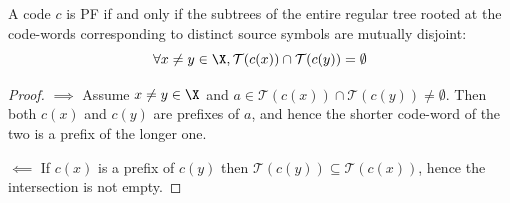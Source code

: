 \documentclass[toc, titlepaged]{../cs-classes/cs-classes}
\begin{document}
\begin{lemma}
    A code $c$ is PF if and only if the subtrees of the entire regular tree rooted at the code-words corresponding to distinct source symbols are mutually disjoint:
    \begin{equation*}
        \forall x\neq y\in \X, \mathcal{T}(c(x))\cap\mathcal{T}(c(y))=\emptyset
    \end{equation*}
\end{lemma}

\begin{proof}
    $\implies$
    Assume $x\neq y\in\X$ and $a\in \mathcal{T}(c(x))\cap\mathcal{T}(c(y))\neq\emptyset$. Then both $c(x)$ and $c(y)$ are prefixes of $a$, and hence the shorter code-word of the two is a prefix of the longer one.

    $\impliedby$ If $c(x)$ is a prefix of $c(y)$ then $\mathcal{T}(c(y))\subseteq \mathcal{T}(c(x))$, hence the intersection is not empty.    
\end{proof}
\end{document}
